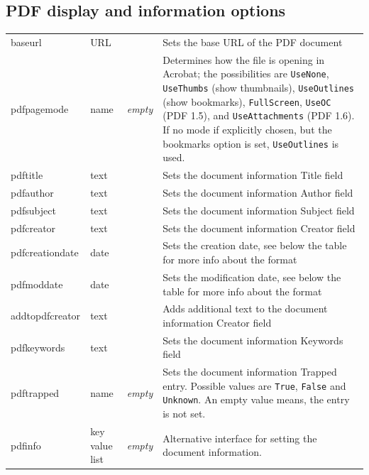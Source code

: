 \documentclass{article}
\begin{document}
\subsection{PDF display and information options}\label{sec:pdfdata}
\begin{longtable}{@{}>{\ttfamily}l>{\raggedright}p{}>{\itshape}lp{7cm}@{}}
baseurl            & URL     &       & Sets the base URL of the PDF document \\
pdfpagemode        & name    & empty & Determines how the file is opening in Acrobat; the possibilities are
                                       \verb|UseNone|, \verb|UseThumbs| (show thumbnails), \verb|UseOutlines|
                                       (show bookmarks), \verb|FullScreen|, \verb|UseOC| (PDF 1.5),
                                       and \verb|UseAttachments| (PDF 1.6). If no mode if explicitly chosen, but the
                                       bookmarks option is set, \verb|UseOutlines| is used. \\
pdftitle           & text    &       & Sets the document information Title field \\
pdfauthor          & text    &       & Sets the document information Author field \\
pdfsubject         & text    &       & Sets the document information Subject field \\
pdfcreator         & text    &       & Sets the document information Creator field \\
pdfcreationdate    & date    &       & Sets the creation date, see below the table for more info about the format\\
pdfmoddate         & date    &       & Sets the modification date, see below the table for more info about the format\\
addtopdfcreator    & text    &       & Adds additional text to the document information Creator field \\
pdfkeywords        & text    &       & Sets the document information Keywords field \\
pdftrapped         & name    & empty & Sets the document information Trapped entry. Possible values are \verb|True|, \verb|False| and \verb|Unknown|.
                                       An empty value means, the entry is not set.\\
%
pdfinfo            & key value list  & empty & Alternative interface for setting the
                                       document information.\\

\end{longtable}
\end{document}
